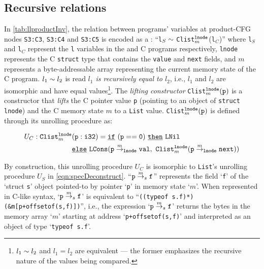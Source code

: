 \subsection{Recursive relations}
In \cref{tab:llproductInv}, the relation between
programs' variables at product-CFG nodes {\tt S3:C3}, {\tt S3:C4} and {\tt S3:C5}
is encoded as a \recursiveRelation{}:
``{\tt l}$_{S}\sim{}${\tt Clist}$^{{\tt lnode}}_{m}$({\tt l}$_C$)'' where {\tt l}$_{S}$ and {\tt l}$_C$ represent the {\tt l} variables in the \SpecL{} and
C programs respectively, {\tt lnode} represents the C {\tt struct} type that contains
the {\tt value} and {\tt next} fields, and
$m$ represents a byte-addressable array representing
the current memory state of
the C program.
$l_1\sim{}l_2$ is read {\em $l_1$ is recursively equal to
$l_2$}, i.e., $l_1$ and $l_2$ are isomorphic and
have equal
values\footnote{$l_1\sim{}l_2$ and
$l_1=l_2$ are equivalent --- the former emphasizes
the recursive nature of the values being compared.}.
The {\em lifting constructor} {\tt Clist}$^{{\tt lnode}}_m({\tt p})$ is a
constructor that {\em lifts}
the C pointer value {\tt p} (pointing to
an object of {\tt struct lnode}) and the C
memory state $m$ to a \SpecL{} {\tt List} value.
{\tt Clist}$^{{\tt lnode}}_m({\tt p})$ is defined through its
unrolling procedure as:
\begin{small}
\begin{equation}\label{eqn:clist}
\begin{split}
U_C: \mathrm{\tt Clist}^{{\tt lnode}}_m&\mathrm{\tt (p:i32)} = \mathrm{\tt \underline{if}\ (p==0)}\ \mathrm{\tt \underline{then}\ }{\tt LNil} \\
                                                         & \mathrm{\tt \underline{else}\ {\tt LCons}(}{\tt p} \overset{m}{\rightarrow}_{{\tt lnode}} {\tt val},\ {\tt Clist}_m^{\tt lnode}({\tt p} \overset{m}{\rightarrow}_{{\tt lnode}} {\tt next}))
\end{split}
\end{equation}
\end{small}
By construction, this unrolling procedure $U_C$ is
isomorphic to {\tt List}'s  unrolling procedure $U_S$ in \cref{eqn:specDeconstruct}.
``{\small ${\tt p} \overset{m}{\rightarrow}_{s} {\tt f}$}'' represents the
field `{\tt f}' of the `struct {\tt s}' object pointed-to by pointer `{\tt p}'
in memory
state `$m$'.  When represented
in C-like syntax, `{\small ${\tt p} \overset{m}{\rightarrow}_{s} {\tt f}$}'
is equivalent to
``{\small {\tt *((typeof s.f)*)(\&m[p+offsetof(s,f)])}}'',
i.e., the expression `{\small ${\tt p} \overset{m}{\rightarrow}_{s} {\tt f}$}'
returns the bytes in the memory array `$m$' starting
at address `{\small {\tt p+offsetof(s,f)}}' and interpreted as an object of
type `{\small \tt typeof s.f}'.

